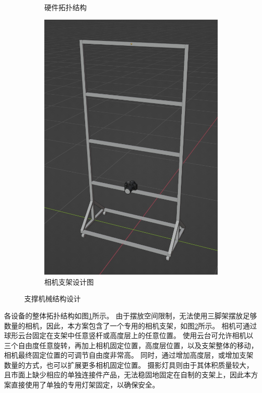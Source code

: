 \begin{figure}
\begin{subfigure}{0.67\textwidth}
    \caption{硬件拓扑结构}
    \label{fig:frame_topo}
\end{subfigure}\hfill%
\begin{subfigure}{0.3\textwidth}
    \includegraphics[width=\textwidth]{figures/frame-design}
    \caption{相机支架设计图}
    \label{fig:frame_cam}
\end{subfigure}%
\caption{支撑机械结构设计}
\label{fig:frame_design}
\end{figure}
各设备的整体拓扑结构如图\ref{fig:frame_topo}所示。
由于摆放空间限制，无法使用三脚架摆放足够数量的相机，因此，本方案包含了一个专用的相机支架，如图\ref{fig:frame_cam}所示。
相机可通过球形云台固定在支架中任意竖杆或高度层上的任意位置。
使用云台可允许相机以三个自由度任意旋转，再加上相机固定位置，高度层位置，以及支架整体的移动，相机最终固定位置的可调节自由度非常高。
同时，通过增加高度层，或增加支架数量的方式，也可以扩展更多相机固定位置。
摄影灯具则由于其体积质量较大，且市面上缺少相应的单独连接件产品，无法稳固地固定在自制的支架上，因此本方案直接使用了单独的专用灯架固定，以确保安全。


